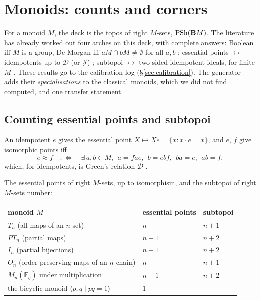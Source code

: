 \section{Monoids: counts and corners}\label{sec:finite}

For a monoid $M$, the deck is the topos of right $M$-sets, $\mathrm{PSh}(\mathbf{B} M)$. The literature has already worked out four arches on this deck, with complete answers: Boolean iff $M$ is a group, De Morgan iff $aM\cap bM\neq\emptyset$ for all $a,b$ \cite{hemelaer-rogers}; essential points $\leftrightarrow$ idempotents up to $\mathcal D$ (or $\mathcal J$) \cite{rogers-1905,pirashvili-jncg}; subtopoi $\leftrightarrow$ two-sided idempotent ideals, for finite $M$ \cite[Prop.~6.1.2]{pirashvili-jncg}. These results go to the calibration log (\S\ref{sec:calibration}). The generator adds their \emph{specialisations} to the classical monoids, which we did not find computed, and one transfer statement.

\subsection{Counting essential points and subtopoi}

An idempotent $e$ gives the essential point $X\mapsto Xe = \{x : x\cdot e = x\}$, and $e$, $f$ give isomorphic points iff
\[
e\approx f\quad:\iff\quad\exists\, a,b\in M,\ \ a = fae,\ \ b = ebf,\ \ ba = e,\ \ ab = f,
\]
which, for idempotents, is Green's relation $\mathcal D$ \cite[Prop.~3.1]{costa-steinberg}.

\begin{theorem}\label{th:fibre}
The essential points of right $M$-sets, up to isomorphism, and the subtopoi of right $M$-sets number:
\begin{center}\small
\begin{tabular}{lll}
\toprule
monoid $M$ & essential points & subtopoi\\
\midrule
$T_n$ (all maps of an $n$-set) & $n$ & $n+1$\\
$PT_n$ (partial maps) & $n+1$ & $n+2$\\
$I_n$ (partial bijections) & $n+1$ & $n+2$\\
$O_n$ (order-preserving maps of an $n$-chain) & $n$ & $n+1$\\
$M_n(\mathbb F_q)$ under multiplication & $n+1$ & $n+2$\\
the bicyclic monoid $\langle p,q\mid pq=1\rangle$ & $1$ & ---\\
\bottomrule
\end{tabular}
\end{center}
\end{theorem}

